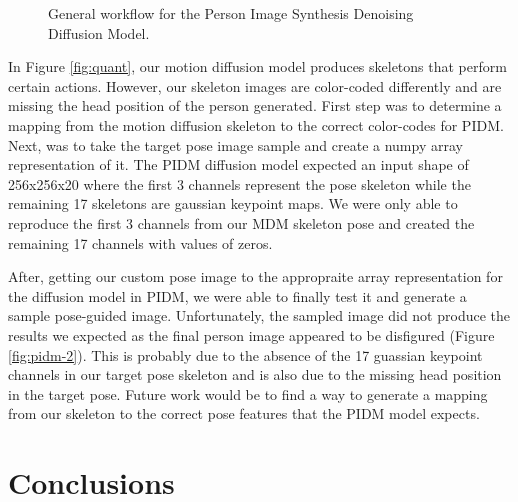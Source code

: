 \documentclass[10pt,twocolumn,letterpaper]{article}
\begin{document}
\begin{figure}[H]
    \centering

    \caption{General workflow for the Person Image Synthesis Denoising Diffusion Model.}
    \label{fig:pidm-1}
\end{figure}

In Figure \ref{fig:quant}, our motion diffusion model produces skeletons that perform certain actions. 
However, our skeleton images are color-coded differently and are missing the head position of the person 
generated. First step was to determine a mapping from the motion diffusion skeleton to the correct color-codes 
for PIDM. Next, was to take the target pose image sample and create a numpy array representation of it. The PIDM 
diffusion model expected an input shape of 256x256x20 where the first 3 channels represent the pose skeleton 
while the remaining 17 skeletons are gaussian keypoint maps. We were only able to reproduce the first 3 channels 
from our MDM skeleton pose and created the remaining 17 channels with values of zeros.


After, getting our custom pose image to the appropraite array representation for the diffusion model in PIDM, 
we were able to finally test it and generate a sample pose-guided image. Unfortunately, the sampled image 
did not produce the results we expected as the final person image appeared to be disfigured (Figure \ref{fig:pidm-2}). 
This is probably due to the absence of the 17 guassian keypoint channels in our target pose skeleton and 
is also due to the missing head position in the target pose. Future work would be to find a way to generate
a mapping from our skeleton to the correct pose features that the PIDM model expects.


\section{Conclusions}
\label{sec:conlusions}
\end{document}
